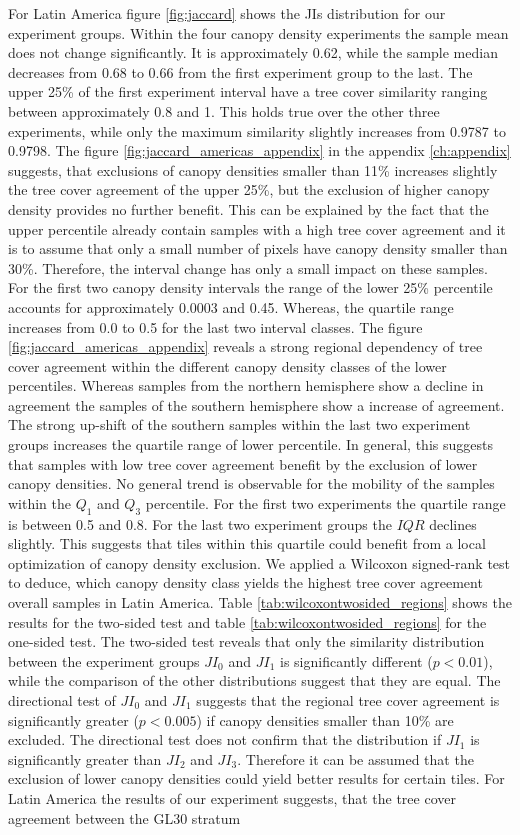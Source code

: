 			For Latin America figure \ref{fig:jaccard} shows the \acp{JI} distribution for our experiment groups. Within the four canopy density experiments the sample mean does not change significantly. It is approximately 0.62, while the sample median decreases from 0.68 to 0.66 from the first experiment group to the last. The upper 25\% of the first experiment interval have a tree cover similarity ranging between approximately 0.8 and 1. This holds true over the other three experiments, while only the maximum similarity slightly increases from 0.9787 to 0.9798. The figure \ref{fig:jaccard_americas_appendix} in the appendix \ref{ch:appendix} suggests, that exclusions of canopy densities smaller than 11\% increases slightly the tree cover agreement of the upper 25\%, but the exclusion of higher canopy density provides no further benefit. This can be explained by the fact that the upper percentile already contain samples with a high tree cover agreement and it is to assume that only a small number of pixels have canopy density smaller than 30\%. Therefore, the interval change has only a small impact on these samples. For the first two canopy density intervals the range of the lower 25\% percentile accounts for approximately 0.0003 and 0.45. Whereas, the quartile range increases from 0.0 to 0.5 for the last two interval classes. The figure \ref{fig:jaccard_americas_appendix} reveals a strong regional dependency of tree cover agreement within the different canopy density classes of the lower percentiles. Whereas samples from the northern hemisphere show a decline in agreement the samples of the southern hemisphere show a increase of agreement. The strong up-shift of the southern samples within the last two experiment groups increases the quartile range of lower percentile. In general, this suggests that samples with low tree cover agreement benefit by the exclusion of lower canopy densities. No general trend is observable for the mobility of the samples within the $Q_1$ and $Q_3$ percentile. For the first two experiments the quartile range is between 0.5 and 0.8. For the last two experiment groups the $IQR$ declines slightly. This suggests that tiles within this quartile could benefit from a local optimization of canopy density exclusion. We applied a Wilcoxon signed-rank test to deduce, which canopy density class yields the highest tree cover agreement overall samples in Latin America. Table \ref{tab:wilcoxontwosided_regions} shows the results for the two-sided test and table \ref{tab:wilcoxontwosided_regions} for the one-sided test. The two-sided test reveals that only the similarity distribution between the experiment groups $JI_0$ and $JI_1$ is significantly different ($p<0.01$), while the comparison of the other distributions suggest that they are equal. The directional test of $JI_0$ and $JI_1$ suggests that the regional tree cover agreement is significantly greater ($p<0.005$) if canopy densities smaller than 10\% are excluded. The directional test does not confirm that the distribution if $JI_1$ is significantly greater than $JI_2$ and $JI_3$. Therefore it can be assumed that the exclusion of lower canopy densities could yield better results for certain tiles. For Latin America the results of our experiment suggests, that the tree cover agreement between the \ac{GL30} stratum 